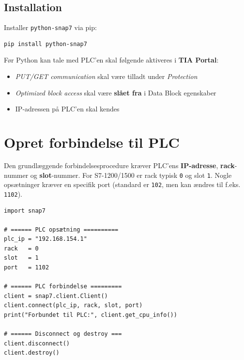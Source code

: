 \documentclass[12pt, a4paper]{article}
\begin{document}
\subsection{Installation}

Installer \texttt{python-snap7} via pip:

\begin{tcolorbox}[pythonbox, title={\faTerminal\quad Terminal — installation}]
\begin{verbatim}
pip install python-snap7
\end{verbatim}
\end{tcolorbox}

\begin{tcolorbox}[warnbox, title={\faExclamationTriangle\quad Vigtigt: PLC-opsætning i TIA Portal}]
Før Python kan tale med PLC'en skal følgende aktiveres i \textbf{TIA Portal}:
\begin{itemize}[itemsep=2pt]
  \item \textit{PUT/GET communication} skal være tilladt under \textit{Protection}
  \item \textit{Optimized block access} skal være \textbf{slået fra} i Data Block egenskaber
  \item IP-adressen på PLC'en skal kendes
\end{itemize}
\end{tcolorbox}

\clearpage
\section{Opret forbindelse til PLC}

Den grundlæggende forbindelsesprocedure kræver PLC'ens \textbf{IP-adresse},
\textbf{rack}-nummer og \textbf{slot}-nummer.
For S7-1200/1500 er rack typisk \texttt{0} og slot \texttt{1}.
Nogle opsætninger kræver en specifik port (standard er \texttt{102}, men
kan ændres til f.eks. \texttt{1102}).

\begin{tcolorbox}[pythonbox, title={\faPython\quad Kode 1 — Opret og afslut forbindelse}]
\begin{verbatim}
import snap7

# ====== PLC opsætning ==========
plc_ip = "192.168.154.1"
rack   = 0
slot   = 1
port   = 1102

# ====== PLC forbindelse =========
client = snap7.client.Client()
client.connect(plc_ip, rack, slot, port)
print("Forbundet til PLC:", client.get_cpu_info())

# ====== Disconnect og destroy ===
client.disconnect()
client.destroy()
\end{verbatim}
\end{tcolorbox}
\end{document}
